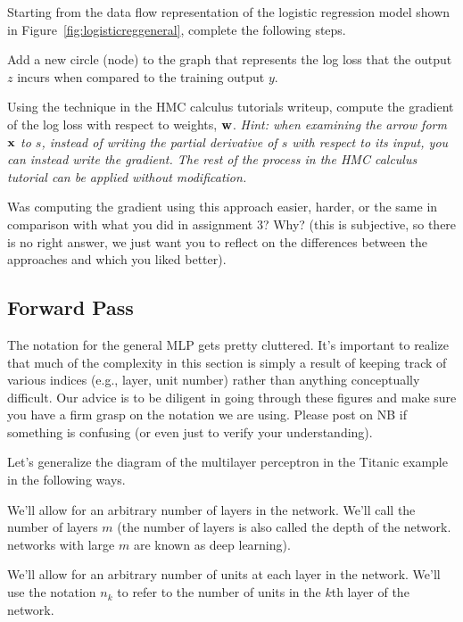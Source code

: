 \documentclass[assignment06_Solutions]{subfiles}
\begin{document}
\begin{exercise}
Starting from the data flow representation of the logistic regression model shown in Figure~\ref{fig:logisticreggeneral}, complete the following steps.
\bes
\item Add a new circle (node) to the graph that represents the log loss that the output $z$ incurs when compared to the training output $y$.
\item Using the technique in the HMC calculus tutorials writeup, compute the gradient of the log loss with respect to weights, $\mathbf{w}$.  \emph{Hint: when examining the arrow form $\mathbf{x}$ to $s$, instead of writing the partial derivative of $s$ with respect to its input, you can instead write the gradient.  The rest of the process in the HMC calculus tutorial can be applied without modification.}
\item Was computing the gradient using this approach easier, harder, or the same in comparison with what you did in assignment 3?  Why? (this is subjective, so there is no right answer, we just want you to reflect on the differences between the approaches and which you liked better).
\ees
\end{exercise}

\subsection{Forward Pass}
\begin{notice}
The notation for the general MLP gets pretty cluttered. It's important to realize that much of the complexity in this section is simply a result of keeping track of various indices (e.g., layer, unit number) rather than anything conceptually difficult.  Our advice is to be diligent in going through these figures and make sure you have a firm grasp on the notation we are using.  Please post on NB if something is confusing (or even just to verify your understanding).
\end{notice}

Let's generalize the diagram of the multilayer perceptron in the Titanic example in the following ways.
\be
\item We'll allow for an arbitrary number of layers in the network.  We'll call the number of layers $m$ (the number of layers is also called the depth of the network.  networks with large $m$ are known as deep learning).
\item We'll allow for an arbitrary number of units at each layer in the network.  We'll use the notation $n_k$ to refer to the number of units in the $k$th layer of the network.
\ee
\end{document}
